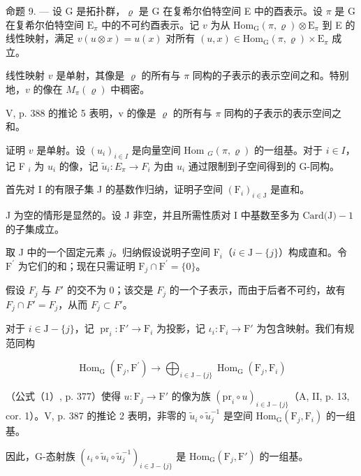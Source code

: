 命题 9. --- 设 G 是拓扑群，\(\varrho\) 是 G 在复希尔伯特空间 E 中的酉表示。设 \(\pi\) 是 G 在复希尔伯特空间 \(\mathrm{E}_{\pi}\) 中的不可约酉表示。记 \(v\) 为从 \(\mathrm{Hom}_{\mathrm{G}}(\pi, \varrho) \otimes \mathrm{E}_{\pi}\) 到 E 的线性映射，满足 \(v(u \otimes x) = u(x)\) 对所有 \((u, x) \in \mathrm{Hom}_{\mathrm{G}}(\pi, \varrho) \times \mathrm{E}_{\pi}\) 成立。

线性映射 \(v\) 是单射，其像是 \(\varrho\) 的所有与 \(\pi\) 同构的子表示的表示空间之和。特别地，\(v\) 的像在 \(M_{\pi}(\varrho)\) 中稠密。

V, p. 388 的推论 5 表明，v 的像是 \(\varrho\) 的所有与 \(\pi\) 同构的子表示的表示空间之和。

证明 \(v\) 是单射。设 \((u_i)_{i \in I}\) 是向量空间 Hom \(_G(\pi, \varrho)\) 的一组基。对于 \(i \in I\)，记 F \(_i\) 为 \(u_i\) 的像，记 \(\widetilde{u}_i \colon E_\pi \to F_i\) 为由 \(u_i\) 通过限制到子空间得到的 G-同构。

首先对 I 的有限子集 J 的基数作归纳，证明子空间 \((\mathrm{F}_{i})_{i\in\mathrm{J}}\) 是直和。

J 为空的情形是显然的。设 J 非空，并且所需性质对 I 中基数至多为 \(\text{Card(J)} - 1\) 的子集成立。

取 J 中的一个固定元素 \(j\)。归纳假设说明子空间 \(\mathrm{F}_{i}\)（\(i\in\mathrm{J}-\{j\}\)）构成直和。令 \(\mathrm{F}^{\prime}\) 为它们的和；现在只需证明 \(\mathrm{F}_{j}\cap\mathrm{F}^{\prime}=\{0\}\)。

假设 \(F_{j}\) 与 \(F'\) 的交不为 0；该交是 \(F_{j}\) 的一个子表示，而由于后者不可约，故有 \(F_{j} \cap F' = F_{j}\)，从而 \(F_{j} \subset F'\)。

对于 \(i \in \mathrm{J} - \{j\}\)，记 \(\operatorname{pr}_i: \mathrm{F}' \to \mathrm{F}_i\) 为投影，记 \(\iota_i: \mathrm{F}_i \to \mathrm{F}'\) 为包含映射。我们有规范同构

\[
\operatorname{Hom} _ {\mathrm{G}} \left(\mathrm{F} _ {j}, \mathrm{F} ^ {\prime}\right)\rightarrow \bigoplus_ {i \in \mathrm{J} - \{j \}} \operatorname{Hom} _ {\mathrm{G}} \left(\mathrm{F} _ {j}, \mathrm{F} _ {i}\right)
\]

（公式（1）, p. 377）使得 \(u \colon \mathrm{F}_j \to \mathrm{F}'\) 的像为族 \((\mathrm{pr}_i \circ u)_{i \in \mathrm{J} - \{j\}}\)（A, II, p. 13, cor. 1）。V, p. 387 的推论 2 表明，非零的 \(\widetilde{u}_i \circ \widetilde{u}_j^{-1}\) 是空间 \(\mathrm{Hom}_{\mathrm{G}}(\mathrm{F}_j, \mathrm{F}_i)\) 的一组基。

因此，G-态射族 \((\iota_{i} \circ \widetilde{u}_{i} \circ \widetilde{u}_{j}^{-1})_{i \in \mathrm{J} - \{j\}}\) 是 \(\mathrm{Hom}_{\mathrm{G}}(\mathrm{F}_{j}, \mathrm{F}')\) 的一组基。

